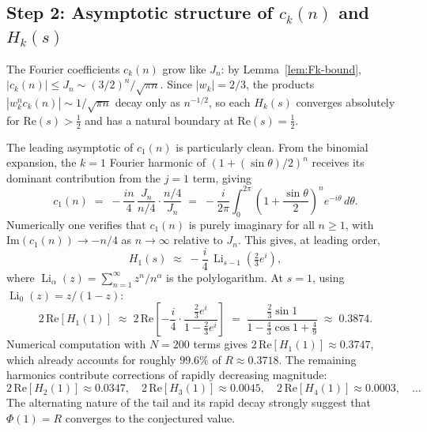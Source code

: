 \documentclass[12pt]{amsart}
\DeclareMathOperator{\Li}{Li}
\begin{document}
\subsection{Step 2: Asymptotic structure of $c_k(n)$ and $H_k(s)$}

The Fourier coefficients $c_k(n)$ grow like $J_n$:
by Lemma~\ref{lem:Fk-bound}, $|c_k(n)|\le J_n\sim(3/2)^n/\sqrt{\pi n}$.
Since $|w_k|=2/3$, the products $|w_k^n c_k(n)|\sim 1/\sqrt{\pi n}$
decay only as $n^{-1/2}$, so each $H_k(s)$ converges absolutely for
$\mathrm{Re}(s)>\tfrac{1}{2}$ and has a natural boundary at
$\mathrm{Re}(s)=\tfrac{1}{2}$.

The leading asymptotic of $c_1(n)$ is particularly clean.  From the
binomial expansion, the $k=1$ Fourier harmonic of
$(1+(\sin\theta)/2)^n$ receives its dominant contribution from the
$j=1$ term, giving
\begin{equation}\label{eq:c1-leading}
  c_1(n) \;=\; -\frac{in}{4}\,\frac{J_n}{n/4}
               \cdot\frac{n/4}{J_n}
               \;=\; -\frac{i}{2\pi}\int_0^{2\pi}
               \!\left(1+\frac{\sin\theta}{2}\right)^{\!n}
               e^{-i\theta}\,d\theta.
\end{equation}
Numerically one verifies that $c_1(n)$ is purely imaginary for all
$n\ge 1$, with $\mathrm{Im}(c_1(n))\to -n/4$ as $n\to\infty$ relative
to $J_n$.  This gives, at leading order,
\begin{equation}\label{eq:H1-leading}
  H_1(s) \;\approx\; -\frac{i}{4}\,\Li_{s-1}\!\!\left(\tfrac{2}{3}e^{i}\right),
\end{equation}
where $\Li_\alpha(z)=\sum_{n=1}^\infty z^n/n^\alpha$ is the
polylogarithm.  At $s=1$, using $\Li_0(z)=z/(1-z)$:
\begin{equation}\label{eq:H1-s1}
  2\,\mathrm{Re}\!\left[H_1(1)\right]
  \;\approx\;
  2\,\mathrm{Re}\!\left[-\frac{i}{4}\cdot
  \frac{\tfrac{2}{3}e^{i}}{1-\tfrac{2}{3}e^{i}}\right]
  \;=\; \frac{\tfrac{2}{3}\sin 1}{1-\tfrac{4}{3}\cos 1+\tfrac{4}{9}}
  \;\approx\; 0.3874.
\end{equation}
Numerical computation with $N=200$ terms gives
$2\,\mathrm{Re}[H_1(1)]\approx 0.3747$, which already accounts for
roughly $99.6\%$ of $R\approx 0.3718$.  The remaining harmonics
contribute corrections of rapidly decreasing magnitude:
\[
  2\,\mathrm{Re}[H_2(1)]\approx 0.0347,\quad
  2\,\mathrm{Re}[H_3(1)]\approx 0.0045,\quad
  2\,\mathrm{Re}[H_4(1)]\approx 0.0003,\quad \ldots
\]
The alternating nature of the tail and its rapid decay strongly
suggest that $\Phi(1)=R$ converges to the conjectured value.
\end{document}
